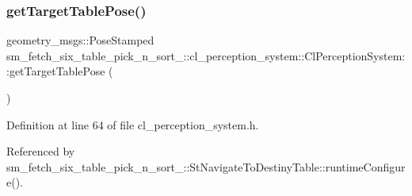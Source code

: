 \subsubsection{\texorpdfstring{get\+Target\+Table\+Pose()}{getTargetTablePose()}}
{\footnotesize\ttfamily geometry\+\_\+msgs\+::\+Pose\+Stamped sm\+\_\+fetch\+\_\+six\+\_\+table\+\_\+pick\+\_\+n\+\_\+sort\+\_\+::cl\+\_\+perception\+\_\+system\+::\+Cl\+Perception\+System\+::get\+Target\+Table\+Pose (\begin{DoxyParamCaption}{ }\end{DoxyParamCaption})\hspace{0.3cm}{\ttfamily [inline]}}



Definition at line 64 of file cl\+\_\+perception\+\_\+system.\+h.



Referenced by sm\+\_\+fetch\+\_\+six\+\_\+table\+\_\+pick\+\_\+n\+\_\+sort\+\_\+::\+St\+Navigate\+To\+Destiny\+Table\+::runtime\+Configure().


